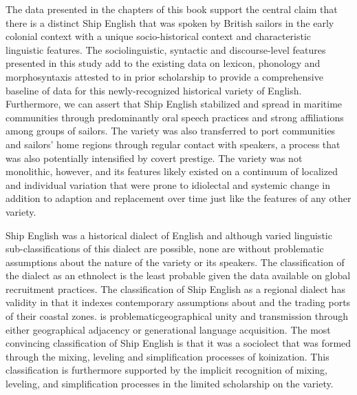 \begin{styleStandard}
The data presented in the chapters of this book support the central claim that there is a distinct Ship English that was spoken by British sailors in the early colonial context with a unique socio-historical context and characteristic linguistic features. The sociolinguistic, syntactic and discourse-level features presented in this study add to the existing data on lexicon, phonology and morphosyntaxis attested to in prior scholarship to provide a comprehensive baseline of data for this newly-recognized historical variety of English. Furthermore, we can assert that Ship English stabilized and spread in maritime communities through predominantly oral speech practices and strong affiliations among groups of sailors. The variety was also transferred to port communities and sailors’ home regions through regular contact with speakers, a process that was also potentially intensified by covert prestige. The variety was not monolithic, however, and its features likely existed on a continuum of localized and individual variation that were prone to idiolectal and systemic change in addition to adaption and replacement over time just like the features of any other variety. 
\end{styleStandard}


\begin{styleStandard}
Ship English was a historical dialect of English and although varied linguistic sub-classifications of this dialect are possible, none are without problematic assumptions about the nature of the variety or its speakers. The classification of the dialect as an ethnolect is the least probable given the data available on global recruitment practices. The classification of Ship English as a regional dialect has validity in that it indexes contemporary assumptions about  and the trading ports of their coastal zones. is problematicgeographical unity and transmission through either geographical adjacency or generational language acquisition. The most convincing classification of Ship English is that it was a sociolect that was formed through the mixing, leveling and simplification processes of koinization. This classification is furthermore supported by the implicit recognition of mixing, leveling, and simplification processes in the limited scholarship on the variety.
\end{styleStandard}


